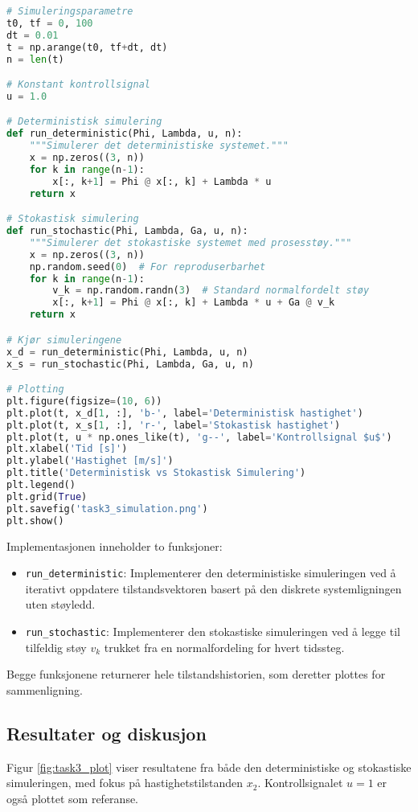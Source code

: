 \documentclass[a4paper,12pt]{article}
\theoremstyle{plain}
\begin{document}
\begin{lstlisting}[language=Python, caption=Implementasjon av simulering]
# Simuleringsparametre
t0, tf = 0, 100
dt = 0.01
t = np.arange(t0, tf+dt, dt)
n = len(t)

# Konstant kontrollsignal
u = 1.0

# Deterministisk simulering
def run_deterministic(Phi, Lambda, u, n):
    """Simulerer det deterministiske systemet."""
    x = np.zeros((3, n))
    for k in range(n-1):
        x[:, k+1] = Phi @ x[:, k] + Lambda * u
    return x

# Stokastisk simulering
def run_stochastic(Phi, Lambda, Ga, u, n):
    """Simulerer det stokastiske systemet med prosesstøy."""
    x = np.zeros((3, n))
    np.random.seed(0)  # For reproduserbarhet
    for k in range(n-1):
        v_k = np.random.randn(3)  # Standard normalfordelt støy
        x[:, k+1] = Phi @ x[:, k] + Lambda * u + Ga @ v_k
    return x

# Kjør simuleringene
x_d = run_deterministic(Phi, Lambda, u, n)
x_s = run_stochastic(Phi, Lambda, Ga, u, n)

# Plotting
plt.figure(figsize=(10, 6))
plt.plot(t, x_d[1, :], 'b-', label='Deterministisk hastighet')
plt.plot(t, x_s[1, :], 'r-', label='Stokastisk hastighet')
plt.plot(t, u * np.ones_like(t), 'g--', label='Kontrollsignal $u$')
plt.xlabel('Tid [s]')
plt.ylabel('Hastighet [m/s]')
plt.title('Deterministisk vs Stokastisk Simulering')
plt.legend()
plt.grid(True)
plt.savefig('task3_simulation.png')
plt.show()
\end{lstlisting}
\clearpage
Implementasjonen inneholder to funksjoner:
\begin{itemize}
    \item \texttt{run\_deterministic}: Implementerer den deterministiske simuleringen ved å iterativt oppdatere tilstandsvektoren basert på den diskrete systemligningen uten støyledd.
    \item \texttt{run\_stochastic}: Implementerer den stokastiske simuleringen ved å legge til tilfeldig støy $v_k$ trukket fra en normalfordeling for hvert tidssteg.
\end{itemize}

Begge funksjonene returnerer hele tilstandshistorien, som deretter plottes for sammenligning.

\subsection{Resultater og diskusjon}
Figur \ref{fig:task3_plot} viser resultatene fra både den deterministiske og stokastiske simuleringen, med fokus på hastighetstilstanden $x_2$. Kontrollsignalet $u = 1$ er også plottet som referanse.
\end{document}
